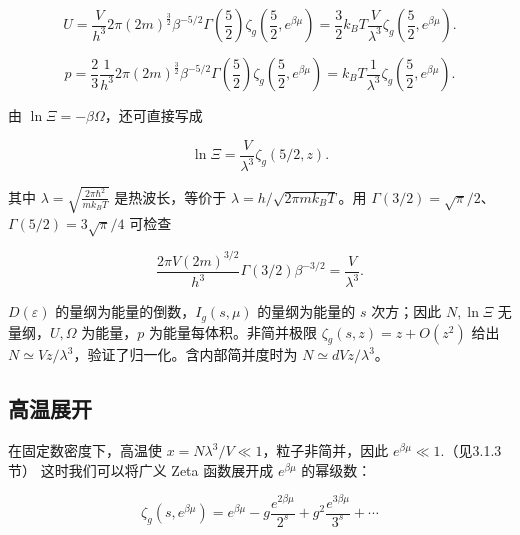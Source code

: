\begin{linenomath}\begin{equation}
    U = \frac{V}{h^3} 2\pi (2m)^{\frac32} \beta^{-5/2}\Gamma\left( \frac{5}{2} \right) \zeta_g\left( \frac{5}{2}, e^{\beta\mu} \right) = \frac{3}{2} k_BT \frac{V}{\lambda^3} \zeta_g\left( \frac{5}{2}, e^{\beta\mu} \right).
\end{equation}\end{linenomath}
\begin{linenomath}\begin{equation}
    p = \frac{2}{3} \frac{1}{h^3} 2\pi (2m)^{\frac32} \beta^{-5/2}\Gamma\left( \frac{5}{2} \right) \zeta_g\left( \frac{5}{2}, e^{\beta\mu} \right) = k_BT \frac{1}{\lambda^3}\zeta_g\left( \frac{5}{2}, e^{\beta\mu} \right).
\end{equation}\end{linenomath}
由 $\ln\varXi=-\beta\Omega$，还可直接写成
\begin{linenomath}\begin{equation}
 \ln\varXi=\frac{V}{\lambda^3}\zeta_g(5/2,z).
\end{equation}\end{linenomath}
其中 $\lambda = \sqrt{\frac{2\pi\hbar^2}{mk_BT}}$ 是热波长，等价于 $\lambda=h/\sqrt{2\pi m k_BT}$。用 $\Gamma(3/2)=\sqrt\pi/2$、$\Gamma(5/2)=3\sqrt\pi/4$ 可检查
\begin{linenomath}\begin{equation}
 \frac{2\pi V(2m)^{3/2}}{h^3}\Gamma(3/2)\beta^{-3/2}=\frac{V}{\lambda^3}.
\end{equation}\end{linenomath}
$D(\varepsilon)$ 的量纲为能量的倒数，$I_g(s,\mu)$ 的量纲为能量的 $s$ 次方；因此 $N,\ln\varXi$ 无量纲，$U,\Omega$ 为能量，$p$ 为能量每体积。非简并极限 $\zeta_g(s,z)=z+O(z^2)$ 给出 $N\simeq Vz/\lambda^3$，验证了归一化。含内部简并度时为 $N\simeq dVz/\lambda^3$。

\subsection{高温展开}
在固定数密度下，高温使 $x=N\lambda^3/V\ll1$，粒子非简并，因此 $e^{\beta\mu} \ll 1.$（见3.1.3节） 这时我们可以将广义 Zeta 函数展开成 $e^{\beta\mu}$ 的幂级数：
\begin{linenomath}\begin{equation}
    \zeta_g(s,e^{\beta\mu}) = e^{\beta\mu} - g \frac{e^{2\beta\mu}}{2^s} + g^2 \frac{e^{3\beta\mu}}{3^s} + \cdots
\end{equation}\end{linenomath}

